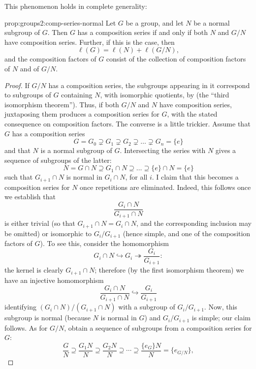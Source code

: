 This phenomenon holds in complete generality:
\begin{prop}{}{prop:groups2:comp-series-normal}
  Let $G$ be a group, and let $N$ be a normal subgroup of $G$. Then
  $G$ has a composition series if and only if both $N$ and $G/N$ have
  composition series.  Further, if this is the case, then
  \[
    \ell(G) = \ell(N) + \ell(G/N),
  \]
  and the composition factors of $G$ consist of the collection of
  composition factors of $N$ and of $G/N$.
\end{prop}
\begin{proof}
  If $G/N$ has a composition series, the subgroups appearing in it
  correspond to subgroups of $G$ containing $N$, with isomorphic
  quotients, by  (the
  ``third isomorphism theorem''). Thus, if both $G/N$ and $N$ have
  composition series, juxtaposing them produces a composition series
  for $G$, with the stated consequence on composition factors.  The
  converse is a little trickier. Assume that $G$ has a composition
  series
  \[
    G = G_0 \supsetneq G_1 \supsetneq G_2 \supsetneq \dots \supsetneq
    G_n = \{e\}
  \]
  and that $N$ is a normal subgroup of $G$. Intersecting the series
  with $N$ gives a sequence of subgroups of the latter:
  \[
    N = G \cap N \supseteq G_1 \cap N \supseteq \dots \supseteq \{e\}
    \cap N = \{e\}
  \]
  such that $G_{i+1} \cap N$ is normal in $G_i \cap N$, for all $i$. I
  claim that this becomes a composition series for $N$ once
  repetitions are eliminated. Indeed, this follows once we establish
  that
  \[
    \frac{G_i \cap N}{G_{i+1} \cap N}
  \]
  is either trivial (so that $G_{i+1} \cap N = G_i \cap N$, and the
  corresponding inclusion may be omitted) or isomorphic to
  $G_i/G_{i+1}$ (hence simple, and one of the composition factors of
  $G$). To see this, consider the homomorphism
  \[
    G_i \cap N \hookrightarrow G_i \twoheadrightarrow
    \frac{G_i}{G_{i+1}}:
  \]
  the kernel is clearly $G_{i+1} \cap N$; therefore (by the first
  isomorphism theorem) we have an injective homomorphism
  \[
    \frac{G_i \cap N}{G_{i+1} \cap N} \hookrightarrow
    \frac{G_i}{G_{i+1}}
  \]
  identifying $(G_i \cap N)/(G_{i+1} \cap N)$ with a subgroup of
  $G_i/G_{i+1}$.  Now, this subgroup is normal (because $N$ is normal
  in $G$) and $G_i/G_{i+1}$ is simple; our claim follows.  As for
  $G/N$, obtain a sequence of subgroups from a composition series for
  $G$:
  \[
    \frac{G}{N} \supseteq \frac{G_1 N}{N} \supseteq \frac{G_2 N}{N}
    \supseteq \cdots \supseteq \frac{\{e_G\}N}{N} = \{e_{G/N}\},
\]
\end{proof}
